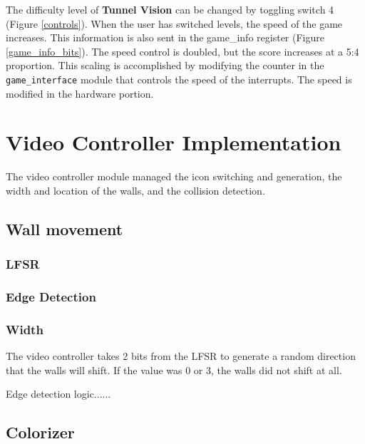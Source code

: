 \documentclass[11pt]{article}
\begin{document}
\hspace{16pt} The difficulty level of \textbf{Tunnel Vision} can be changed by toggling switch 4 (Figure \ref{controls}). When the user has switched levels, the speed of the game increases.  This information is also sent in the game\_info register (Figure \ref{game_info_bits}).  The speed control is doubled, but the score increases at a 5:4 proportion.  This scaling is accomplished by modifying the counter in the \texttt{game\_interface} module that controls the speed of the interrupts. The speed is modified in the hardware portion.\\

	
\section{Video Controller Implementation}
	The video controller module managed the icon switching and generation, the width and location of the walls, and the collision detection.
	

\subsection{Wall movement}

\subsubsection{LFSR}

\subsubsection{Edge Detection}

\subsubsection{Width}
The video controller takes 2 bits from the LFSR to generate a random direction that the walls will shift.  If the value was 0 or 3, the walls did not shift at all. 

Edge detection logic......
		
		\subsection{Colorizer}
		
\end{document}
